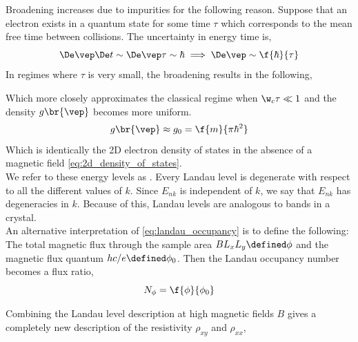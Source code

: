 \documentclass{article}
\begin{document}
Broadening increases due to impurities for the following reason. Suppose that an electron exists in a quantum state for some time $\tau$ which corresponds to the mean free time between collisions. The uncertainty in energy time is,
\[ \De \vep \De t \sim \De \vep \tau \sim \hbar \implies \De \vep \sim \f{\hbar}{\tau} \]
In regimes where $\tau$ is very small, the broadening results in the following,
\begin{center}
\end{center}
Which more closely approximates the classical regime when $\w_c \tau \ll 1$ and the density $g\br{\vep}$ becomes more uniform.
\[ g\br{\vep} \approx g_0 = \f{m}{\pi \hbar^2} \]
Which is identically the 2D electron density of states in the absence of a magnetic field \cref{eq:2d_density_of_states}.\\

We refer to these energy levels as . Every Landau level is degenerate with respect to all the different values of $k$. Since $E_{nk}$ is independent of $k$, we say that $E_{nk}$ has degeneracies in $k$. Because of this, Landau levels are analogous to bands in a crystal. \\

An alternative interpretation of \cref{eq:landau_occupancy} is to define the following: The total magnetic flux through the sample area $B L_x L_ y \defined \phi$ and the magnetic flux quantum $hc / e \defined \phi_0$. Then the Landau occupancy number becomes a flux ratio,
\[ N_{\phi} = \f{\phi}{\phi_0} \]

Combining the Landau level description at high magnetic fields $B$ gives a completely new description of the resistivity $\rho_{xy}$ and $\rho_{xx}$,
\end{document}
